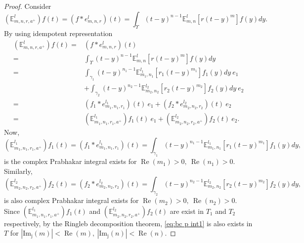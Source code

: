 \documentclass[a4paper,12pt]{article}
\theoremstyle{remark}
\begin{document}
\begin{proof} Consider
	\begin{equation}	(\mathbb{E}_{m,n,r,a^+}^l)f(t)=(f*e_{m,n,r}^l)(t)=\int_{\varUpsilon}(t-y)^{n-1}\mathbb{E}_{m,n}^l[{r(t-y)^m}]f(y)dy.
	\end{equation}
    By using idempotent representation
	\begin{equation}
	\begin{split}		
(\mathbb{E}_{m,n,r,a^+}^l)f(t)=&(f*e_{m,n,r}^l)(t)\\
	=&\int_{\varUpsilon}(t-y)^{n-1}\mathbb{E}_{m,n}^l[{r(t-y)^m}]f(y)dy\\
	=&\int_{\gamma_1}(t-y)^{n_1-1}\mathbb{E}_{m_1,n_1}^{l_1}[{r_1(t-y)^{m_1}}]f_1(y)dy~e_1\\
	&+\int_{\gamma_2}(t-y)^{n_2-1}\mathbb{E}_{m_2,n_2}^{l_2}[{r_2(t-y)^{m_2}}]f_2(y)dy~e_2\\
	=&(f_1*e_{m_1,n_1,r_1}^{l_1})(t)~e_1+(f_2*e_{m_2,n_2,r_2}^{l_2})(t)~e_2\\=&	(\mathbb{E}_{m_1,n_1,r_1,a^+}^{l_1})f_1(t)~e_1+(\mathbb{E}_{m_2,n_2,r_2,a^+}^{l_2})f_2(t)~e_2.\label{eq:bc p int idem}
	\end{split}
	\end{equation}
Now, 	\begin{equation}	(\mathbb{E}_{m_1,n_1,r_1,a^+}^{l_1})f_1(t)=(f_1*e_{m_1,n_1,r_1}^{l_1})(t)=\int_{\gamma_1}(t-y)^{n_1-1}\mathbb{E}_{m_1,n_1}^{l_1}[{r_1(t-y)^{m_1}}]f_1(y)dy,
	\end{equation}
	is the complex Prabhakar integral \cite{polito2016some,garra2014hilfer} exists for $\operatorname{Re}(m_1)>0,~\operatorname{Re}(n_1)>0.$ \\
	Similarly,
	\begin{equation}	(\mathbb{E}_{m_2,n_2,r_2,a^+}^{l_2})f_2(t)=(f_2*e_{m_2,n_2,r_2}^{l_2})(t)=\int_{\gamma_2}(t-y)^{n_2-1}\mathbb{E}_{m_2,n_2}^{l_2}[{r_2(t-y)^{m_2}}]f_2(y)dy,
	\end{equation}
	is also complex Prabhakar integral exists for $\operatorname{Re}(m_2)>0,~\operatorname{Re}(n_2)>0.$ \\
	Since $ (\mathbb{E}_{m_1,n_1,r_1,a^+}^{l_1})f_1(t)$ and $(\mathbb{E}_{m_2,n_2,r_2,a^+}^{l_2})f_2(t)$ are exist in $T_1$ and $ T_2$ respectively, by the Ringleb
	decomposition theorem,  \eqref{eq:bc p int1} is also exists in $T$ for $|\operatorname{Im_j}(m)|<\operatorname{Re}(m),~|\operatorname{Im_j}(n)|<\operatorname{Re}(n).$	
\end{proof}
\end{document}
